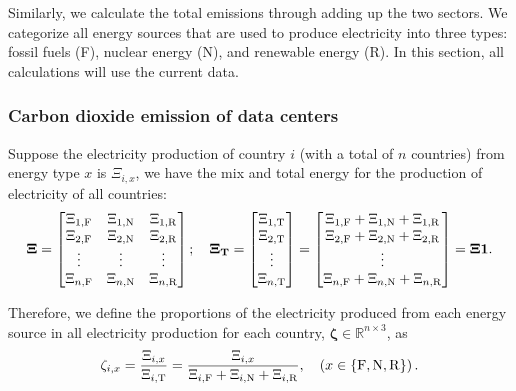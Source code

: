 \documentclass[12pt]{article}
\begin{document}
Similarly, we calculate the total emissions through adding up the two sectors. We categorize all energy sources that are used to produce electricity into three types: fossil fuels (F), nuclear energy (N), and renewable energy (R). In this section, all calculations will use the current data.

\subsubsection{Carbon dioxide emission of data centers}

Suppose the electricity production of country $i$ (with a total of $n$ countries) from energy type $x$ is $\Xi_{i,x}$, we have the mix and total energy for the production of electricity of all countries:
\begin{equation}
	\vb{\Xi} = \begin{bmatrix}
		\Xi_{1,\rm F} & \Xi_{1,\rm N} & \Xi_{1,\rm R} \\
		\Xi_{2,\rm F} & \Xi_{2,\rm N} & \Xi_{2,\rm R} \\
		\vdots & \vdots & \vdots \\
		\Xi_{n,\rm F} & \Xi_{n,\rm N} & \Xi_{n,\rm R} \\
	\end{bmatrix}; \quad
	\vb{\Xi_T}
	= \begin{bmatrix}
		\Xi_{1,\rm T} \\
		\Xi_{2,\rm T} \\
		\vdots \\
		\Xi_{n,\rm T} \\
	\end{bmatrix}
	= \begin{bmatrix}
		\Xi_{1,\rm F} + \Xi_{1,\rm N} + \Xi_{1,\rm R} \\
		\Xi_{2,\rm F} + \Xi_{2,\rm N} + \Xi_{2,\rm R} \\
		\vdots \\
		\Xi_{n,\rm F} + \Xi_{n,\rm N} + \Xi_{n,\rm R} \\
	\end{bmatrix}
	= \vb{\Xi} \vb{1}.
\end{equation}

Therefore, we define the proportions of the electricity produced from each energy source in all electricity production for each country, $\boldsymbol{\zeta} \in \mathbb{R}^{n \times 3}$, as
\begin{equation}
	\zeta_{i, x}
	= \frac{\Xi_{i, x}}{\Xi_{i,\rm T}}
	= \frac{\Xi_{i, x}}{\Xi_{i,\rm F} + \Xi_{i,\rm N} + \Xi_{i,\rm R}}, \quad
	\left(
		x \in \left\{ \rm F, N, R \right\}
	\right).
\end{equation}
\end{document}
